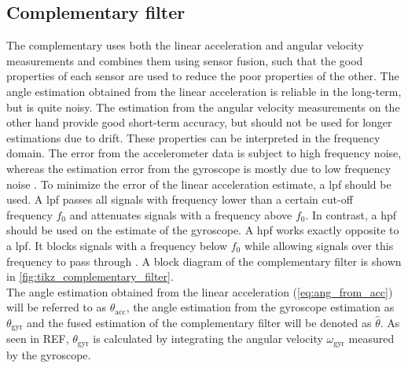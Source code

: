 \subsection{Complementary filter}
The complementary uses both the linear acceleration and angular velocity measurements and combines them using sensor fusion, such that the good properties of each sensor are used to reduce the poor properties of the other.
The angle estimation obtained from the linear acceleration is reliable in the long-term, but is quite noisy.
The estimation from the angular velocity measurements on the other hand provide good short-term accuracy, but should not be used for longer estimations due to drift.
These properties can be interpreted in the frequency domain.
The error from the accelerometer data is subject to high frequency noise, whereas the estimation error from the gyroscope is mostly due to low frequency noise \cite{2007Colton}.
To minimize the error of the linear acceleration estimate, a \gls{lpf} should be used.
A \gls{lpf} passes all signals with frequency lower than a certain cut-off frequency $f_0$ and attenuates signals with a frequency above $f_0$.
In contrast, a \gls{hpf} should be used on the estimate of the gyroscope.
A \gls{hpf} works exactly opposite to a \gls{lpf}.
It blocks signals with a frequency below $f_0$ while allowing signals over this frequency to pass through \cite{Lyons1996}. A block diagram of the complementary filter is shown in \cref{fig:tikz_complementary_filter}.\\
The angle estimation obtained from the linear acceleration (\cref{eq:ang_from_acc}) will be referred to as $\theta_\mathrm{acc}$, the angle estimation from the gyroscope estimation as $\theta_\mathrm{gyr}$ and the fused estimation of the complementary filter will be denoted as $\hat{\theta}$.
As seen in REF, $\theta_\mathrm{gyr}$ is calculated by integrating the angular velocity $\omega_\mathrm{gyr} $ measured by the gyroscope.
